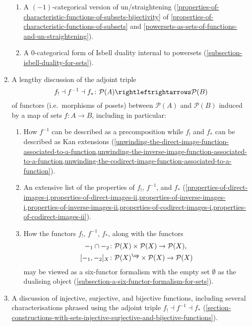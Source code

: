 \begin{enumerate}
\begin{enumerate}
            \item\label{constructions-with-sets-introduction-item-2e}A $(-1)$-categorical version of un/straightening (\cref{properties-of-characteristic-functions-of-subsets-bijectivity} of \cref{properties-of-characteristic-functions-of-subsets} and \cref{powersets-as-sets-of-functions-and-un-straightening}).
            \item\label{constructions-with-sets-introduction-item-2f}A 0-categorical form of Isbell duality internal to powersets (\cref{subsection-isbell-duality-for-sets}).
        \end{enumerate}
    \item\label{constructions-with-sets-introduction-item-3}A lengthy discussion of the adjoint triple%
        \[
            f_{!}\dashv f^{-1}\dashv f_{*}%
            \colon%
            \mathcal{P}(A)%
            \rightleftrightarrows%
            \mathcal{P}(B)%
        \]%
        of functors (i.e.\ morphisms of posets) between $\mathcal{P}(A)$ and $\mathcal{P}(B)$ induced by a map of sets $f\colon A\to B$, including in particular:
        \begin{enumerate}
            \item\label{constructions-with-sets-introduction-item-3a}How $f^{-1}$ can be described as a precomposition while $f_{!}$ and $f_{*}$ can be described as Kan extensions (\cref{unwinding-the-direct-image-function-associated-to-a-function,unwinding-the-inverse-image-function-associated-to-a-function,unwinding-the-codirect-image-function-associated-to-a-function}).
            \item\label{constructions-with-sets-introduction-item-3b}An extensive list of the properties of $f_{!}$, $f^{-1}$, and $f_{*}$ (\cref{properties-of-direct-images-i,properties-of-direct-images-ii,properties-of-inverse-images-i,properties-of-inverse-images-ii,properties-of-codirect-images-i,properties-of-codirect-images-ii}).
            \item\label{constructions-with-sets-introduction-item-3c}How the functors $f_{!}$, $f^{-1}$, $f_{*}$, along with the functors
                \begin{align*}
                    -_{1}\cap-_{2}    &\colon \mathcal{P}(X)\times\mathcal{P}(X)       \to \mathcal{P}(X),\\
                    [-_{1},-_{2}]_{X} &\colon \mathcal{P}(X)^{\op}\times\mathcal{P}(X) \to \mathcal{P}(X)
                \end{align*}
                may be viewed as a six-functor formalism with the empty set $\emptyset$ as the dualising object (\cref{subsection-a-six-functor-formalism-for-sets}).
        \end{enumerate}
    \item\label{constructions-with-sets-introduction-item-4}A discussion of injective, surjective, and bijective functions, including several characterisations phrased using the adjoint triple $f_{!}\dashv f^{-1}\dashv f_{*}$ (\cref{section-constructions-with-sets-injective-surjective-and-bijective-functions}).
\end{enumerate}

